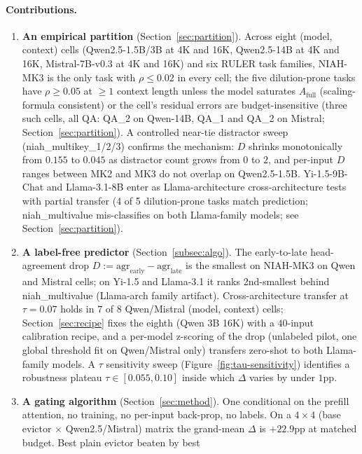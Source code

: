\documentclass{article}
\begin{document}
\paragraph{Contributions.}
\begin{enumerate}
  \item \textbf{An empirical partition} (Section~\ref{sec:partition}). Across
  eight (model, context) cells (Qwen2.5-1.5B/3B at 4K and 16K, Qwen2.5-14B at
  4K and 16K, Mistral-7B-v0.3 at 4K and 16K) and six RULER task families,
  NIAH-MK3 is the only task with $\rho \le 0.02$ in every cell; the five
  dilution-prone tasks have $\rho \ge 0.05$ at $\geq 1$ context length unless
  the model saturates $A_{\mathrm{full}}$ (scaling-formula consistent) or the
  cell's residual errors are budget-insensitive (three such cells, all QA:
  QA\_2 on Qwen-14B, QA\_1 and QA\_2 on Mistral;
  Section~\ref{sec:partition}). A
  controlled near-tie distractor sweep (niah\_multikey\_1/2/3) confirms the
  mechanism: $D$ shrinks monotonically from $0.155$ to $0.045$ as distractor
  count grows from $0$ to $2$, and per-input $D$ ranges between MK2 and MK3
  do not overlap on Qwen2.5-1.5B. Yi-1.5-9B-Chat and Llama-3.1-8B enter as
  Llama-architecture cross-architecture tests with partial transfer (4 of 5
  dilution-prone tasks match prediction; niah\_multivalue mis-classifies on
  both Llama-family models; see Section~\ref{sec:partition}).
  \item \textbf{A label-free predictor} (Section~\ref{subsec:algo}). The
  early-to-late head-agreement drop $D := \mathrm{agr}_{\text{early}} -
  \mathrm{agr}_{\text{late}}$ is the smallest on NIAH-MK3 on Qwen and Mistral
  cells; on Yi-1.5 and Llama-3.1 it ranks 2nd-smallest behind niah\_multivalue
  (Llama-arch family artifact). Cross-architecture transfer at $\tau = 0.07$
  holds in $7$ of $8$ Qwen/Mistral (model, context) cells; Section~\ref{sec:recipe}
  fixes the eighth (Qwen 3B 16K) with a $40$-input calibration recipe, and a
  per-model z-scoring of the drop (unlabeled pilot, one global threshold fit
  on Qwen/Mistral only) transfers zero-shot to both Llama-family models. A $\tau$
  sensitivity sweep (Figure~\ref{fig:tau-sensitivity}) identifies a robustness
  plateau $\tau \in [0.055, 0.10]$ inside which $\Delta$ varies by under
  $1$pp.
  \item \textbf{A gating algorithm} (Section~\ref{sec:method}). One conditional
  on the prefill attention, no training, no per-input back-prop, no labels. On a
  $4 \times 4$ (base evictor $\times$ Qwen2.5/Mistral) matrix the grand-mean
  $\Delta$ is $+22.9$pp at matched budget. Best plain evictor beaten by best

\end{enumerate}
\end{document}
